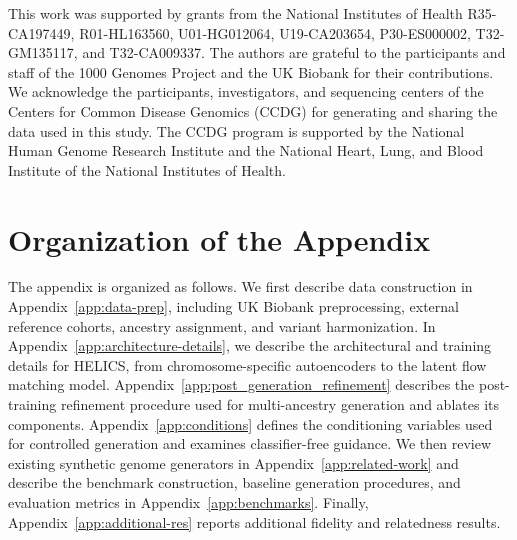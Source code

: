 \documentclass{article}
\begin{document}
This work was supported by grants from the National Institutes of Health R35-CA197449, R01-HL163560, U01-HG012064, U19-CA203654, P30-ES000002, T32-GM135117, and T32-CA009337. The authors are grateful to the participants and staff of the 1000 Genomes Project and the UK Biobank for their contributions. We acknowledge the participants, investigators, and sequencing centers of the Centers for Common Disease Genomics (CCDG) for generating and sharing the data used in this study. The CCDG program is supported by the National Human Genome Research Institute and the National Heart, Lung, and Blood Institute of the National Institutes of Health.

{
\small


}

\newpage
\appendix

\renewcommand{\thesection}{\Alph{section}}


\renewcommand{\thefigure}{\thesection\arabic{figure}}
\renewcommand{\thetable}{\thesection\arabic{table}}
\renewcommand{\theequation}{\thesection\arabic{equation}}


\section*{Organization of the Appendix}

The appendix is organized as follows. We first describe data construction in Appendix~\ref{app:data-prep}, including UK Biobank preprocessing, external reference cohorts, ancestry assignment, and variant harmonization. In Appendix~\ref{app:architecture-details}, we describe the architectural and training details for HELICS, from chromosome-specific autoencoders to the latent flow matching model. Appendix~\ref{app:post_generation_refinement} describes the post-training refinement procedure used for multi-ancestry generation and ablates its components. Appendix~\ref{app:conditions} defines the conditioning variables used for controlled generation and examines classifier-free guidance. We then review existing synthetic genome generators in Appendix~\ref{app:related-work} and describe the benchmark construction, baseline generation procedures, and evaluation metrics in Appendix~\ref{app:benchmarks}. Finally, Appendix~\ref{app:additional-res} reports additional fidelity and relatedness results.
\end{document}
